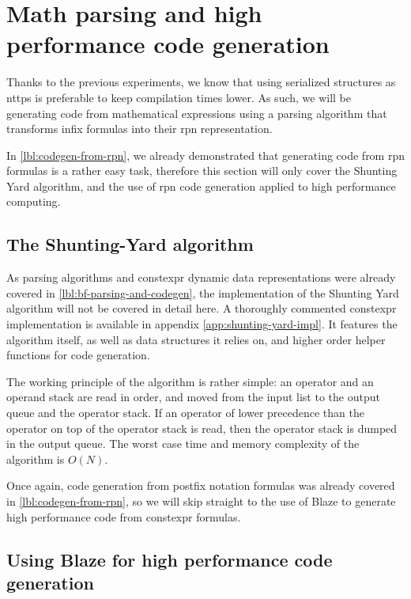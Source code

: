 \documentclass[../main]{subfiles}
\begin{document}

\section{
  Math parsing and high performance code generation
}

Thanks to the previous experiments, we know that using serialized structures
as \glspl{nttp} is preferable to keep compilation times lower.
As such, we will be generating code from mathematical expressions using
a parsing algorithm that transforms infix formulas into their \gls{rpn}
representation.

In \ref{lbl:codegen-from-rpn}, we already demonstrated that generating code
from \gls{rpn} formulas is a rather easy task, therefore this section
will only cover the Shunting Yard algorithm, and the use of \gls{rpn}
code generation applied to high performance computing.

\subsection{
  The Shunting-Yard algorithm
}

As parsing algorithms and \gls{constexpr} dynamic data representations were
already covered in \ref{lbl:bf-parsing-and-codegen}, the implementation of
the Shunting Yard algorithm will not be covered in detail here.
A thoroughly commented \gls{constexpr} implementation is available in appendix
\ref{app:shunting-yard-impl}. It features the algorithm itself, as well as
data structures it relies on, and higher order helper functions
for code generation.

The working principle of the algorithm is rather simple:
an operator and an operand stack are read in order, and moved
from the input list to the output queue and the operator stack.
If an operator of lower precedence than the operator on top of the
operator stack is read, then the operator stack is dumped in the output queue.
The worst case time and memory complexity of the algorithm is $O(N)$.

Once again, code generation from postfix notation formulas was already covered
in \ref{lbl:codegen-from-rpn}, so we will skip straight to the use of Blaze
to generate high performance code from \gls{constexpr} formulas.

\subsection{
  Using Blaze for high performance code generation
}
\end{document}
